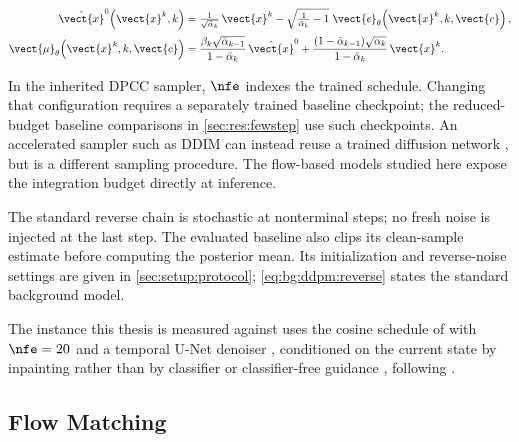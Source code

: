 \begin{align}
  \hat{\vect{x}}^{0}\!\left(\vect{x}^{k},k\right)
    &= \tfrac{1}{\sqrt{\bar{\alpha}_{k}}}\,\vect{x}^{k}
       - \sqrt{\tfrac{1}{\bar{\alpha}_{k}}-1}\;\vect{\epsilon}_{\theta}\!\left(\vect{x}^{k},k,\vect{c}\right),
       \label{eq:bg:ddpm:x0} \\[2pt]
  \vect{\mu}_{\theta}\!\left(\vect{x}^{k},k,\vect{c}\right)
    &= \frac{\beta_{k}\sqrt{\bar{\alpha}_{k-1}}}{1-\bar{\alpha}_{k}}\,\hat{\vect{x}}^{0}
     + \frac{(1-\bar{\alpha}_{k-1})\sqrt{\alpha_{k}}}{1-\bar{\alpha}_{k}}\,\vect{x}^{k}.
       \label{eq:bg:ddpm:mean}
\end{align}

In the inherited DPCC sampler, $\nfe$ indexes the trained schedule. Changing that configuration
requires a separately trained baseline checkpoint; the reduced-budget baseline comparisons in
\autoref{sec:res:fewstep} use such checkpoints. An accelerated sampler such as DDIM can instead
reuse a trained diffusion network \parencite{song2021denoising}, but is a different sampling procedure.
The flow-based models studied here expose the integration budget directly at inference.

The standard reverse chain is stochastic at nonterminal steps; no fresh noise is injected at the
last step. The evaluated baseline also clips its clean-sample estimate before computing the
posterior mean. Its initialization and reverse-noise settings are given in
\autoref{sec:setup:protocol}; \eqref{eq:bg:ddpm:reverse} states the standard background model.

The instance this thesis is measured against uses the cosine schedule of
\parencite{nichol2021improved} with $\nfe = 20$ and a temporal U-Net denoiser
\parencite{janner2022planning}, conditioned on the current state by inpainting rather than by
classifier or classifier-free guidance \parencite{dhariwal2021diffusion,ho2022classifier}, following
\parencite[Sec.~6.1]{romer2025diffusion}.

\subsection{Flow Matching}\label{sec:method:fm}

